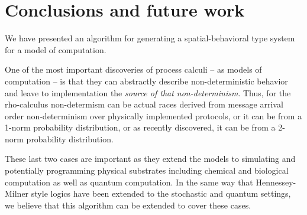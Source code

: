 \section{Conclusions and future work}

We have presented an algorithm for generating a spatial-behavioral
type system for a model of computation.

One of the most important discoveries of process calculi -- as models
of computation -- is that they can abstractly describe
non-deterministic behavior and leave to implementation the
\emph{source of that non-determinism}. Thus, for the rho-calculus
non-determism can be actual races derived from message arrival order
non-determinism over physically implemented protocols, or it can be
from a 1-norm probability distribution, or as recently discovered, it
can be from a 2-norm probability distribution.

These last two cases are important as they extend the models to
simulating and potentially programming physical substrates including
chemical and biological computation as well as quantum computation. In
the same way that Hennessey-Milner style logics have been extended to
the stochastic and quantum settings, we believe that this algorithm
can be extended to cover these cases.



